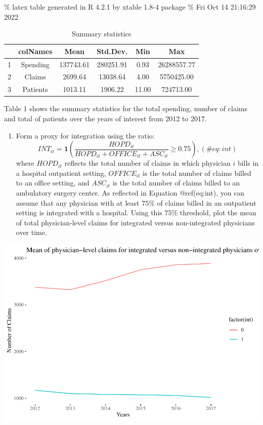 \documentclass[
  12pt,
]{article}
\providecommand{\tightlist}{%
  \setlength{\itemsep}{0pt}\setlength{\parskip}{0pt}}
\begin{document}
\% latex table generated in R 4.2.1 by xtable 1.8-4 package \% Fri Oct
14 21:16:29 2022

\begin{table}[ht]
\centering
\begin{tabular}{cccccc}
  \hline
 & colNames & Mean & Std.Dev. & Min & Max \\ 
  \hline
1 & Spending & 137743.61 & 280251.91 & 0.93 & 26288557.77 \\ 
  2 & Claims & 2699.64 & 13038.64 & 4.00 & 5750425.00 \\ 
  3 & Patients & 1013.11 & 1906.22 & 11.00 & 724713.00 \\ 
   \hline
\end{tabular}
\caption{Summary statistics} 
\label{tab:sum_stat}
\end{table}

Table 1 shows the summary statistics for the total spending, number of
claims and total of patients over the years of interest from 2012 to
2017.

\begin{enumerate}
\def\labelenumi{\arabic{enumi}.}
\setcounter{enumi}{1}
\tightlist
\item
  Form a proxy for integration using the ratio: \begin{equation}
   INT_{it} = \mathbf{1} \left(\frac{HOPD_{it}}{HOPD_{it} + OFFICE_{it} + ASC_{it}} \geq 0.75\right),
   (\#eq:int)
   \end{equation} where \(HOPD_{it}\) reflects the total number of
  claims in which physician \(i\) bills in a hospital outpatient
  setting, \(OFFICE_{it}\) is the total number of claims billed to an
  office setting, and \(ASC_{it}\) is the total number of claims billed
  to an ambulatory surgery center. As reflected in Equation
  @ref(eq:int), you can assume that any physician with at least \(75\%\)
  of claims billed in an outpatient setting is integrated with a
  hospital. Using this \(75\%\) threshold, plot the mean of total
  physician-level claims for integrated versus non-integrated physicians
  over time.
\end{enumerate}

\includegraphics{Report2_files/figure-latex/Q2, -1.pdf}
\end{document}
